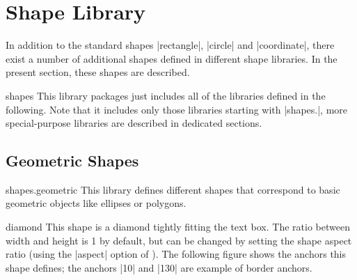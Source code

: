 %
%
%


\section{Shape Library}

In addition to the standard shapes |rectangle|, |circle| and
|coordinate|, there exist a number of additional shapes defined in
different shape libraries. In the present section, these shapes are
described. 


\begin{pgflibrary}{shapes}
  This library packages just includes all of the libraries defined in
  the following. Note that it includes only those libraries starting
  with |shapes.|, more special-purpose libraries are described in
  dedicated sections.
\end{pgflibrary}


\subsection{Geometric Shapes}

\begin{pgflibrary}{shapes.geometric}
  This library defines different shapes that correspond to basic
  geometric objects like ellipses or polygons.
\end{pgflibrary}


\begin{shape}{diamond}
  This shape is a diamond tightly fitting the text box. The ratio
  between width and height is 1 by default, but can be changed by
  setting the shape aspect ratio (using the |aspect| option of
  \tikzname). The following figure shows the anchors this
  shape defines; the anchors |10| and |130| are example of border anchors.
\begin{codeexample}[]
\Huge
{}
\end{codeexample}
\end{shape}

